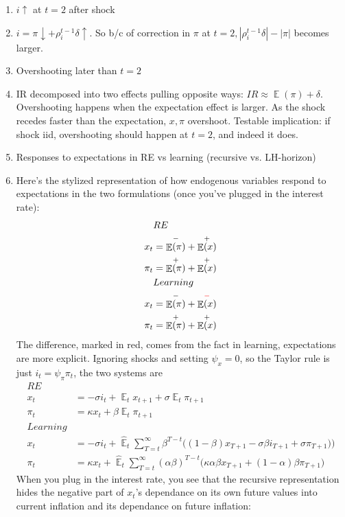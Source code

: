 \documentclass[11pt]{article}
\renewcommand{\[}{\begin{equation}}
\renewcommand{\]}{\end{equation}}
\DeclareMathOperator{\E}{\mathbb{E}}
\begin{document}
\begin{enumerate}
\item $i \uparrow$ at $t=2$ after shock
\item [] $i = \pi \downarrow + \rho_i^{t-1}\delta \uparrow$. So b/c of correction in $\pi$ at $t=2, |\rho_i^{t-1}\delta| - |\pi| $ becomes larger.
\item Overshooting later than $t=2$
\item[] IR decomposed into two effects pulling opposite ways: $ IR \approx \E(\pi) + \delta$. Overshooting happens when the expectation effect is larger. As the shock recedes faster than the expectation, $x, \pi$ overshoot. Testable implication: if shock iid, overshooting should happen at $t=2$, and indeed it does. 
\item Responses to expectations in RE vs learning (recursive vs. LH-horizon) 
\item[] Here's the stylized representation of how endogenous variables respond to expectations in the two formulations (once you've plugged in the interest rate):
\begin{align*}
& RE \\
x_t & = \overset{-}{\E(\pi)} + \overset{+}{\E(x)} \\  
\pi_t & = \overset{+}{\E(\pi)} + \overset{+}{\E(x)} \\
& Learning \\
x_t & = \overset{-}{\E(\pi)} + \overset{\textcolor{red}{-}}{\E(x)} \\  
\pi_t & = \overset{+}{\E(\pi)} + \overset{+}{\E(x)} \\
\end{align*}
The difference, marked in red, comes from the fact in learning, expectations are more explicit.
Ignoring shocks and setting $\psi_x = 0$, so the Taylor rule is just $i_t =  \psi_{\pi}\pi_t$, the two systems are
\begin{align*}
RE& \\
x_t &= - \sigma i_t + \E_t x_{t+1}   + \sigma \E_t \pi_{t+1}  \\
\pi_t &= \kappa x_t +\beta \E_t \pi_{t+1} \\
Learning & \\
x_t &=  -\sigma i_t +\hat{\E}_t \sum_{T=t}^{\infty} \beta^{T-t }\big( (1-\beta)x_{T+1} - \sigma\beta i_{T+1} +\sigma \pi_{T+1}) \big)  \\
\pi_t &= \kappa x_t +\hat{\E}_t \sum_{T=t}^{\infty} (\alpha\beta)^{T-t }\big( \kappa \alpha \beta x_{T+1} + (1-\alpha)\beta \pi_{T+1} \big)
\end{align*}
When you plug in the interest rate, you see that the recursive representation hides the negative part of $x_t$'s dependance on its own future values into current inflation and its dependance on future inflation:

\end{enumerate}
\end{document}
